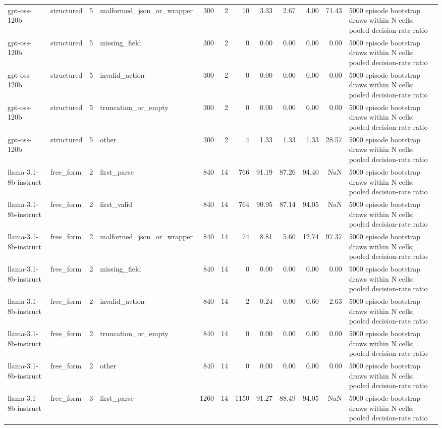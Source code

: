 \begin{tabular}{llllrrrrrrrl}
gpt-oss-120b & structured & 5 & malformed\_json\_or\_wrapper & 300 & 2 & 10 & 3.33 & 2.67 & 4.00 & 71.43 & 5000 episode bootstrap draws within N cells; pooled decision-rate ratio \\
gpt-oss-120b & structured & 5 & missing\_field & 300 & 2 & 0 & 0.00 & 0.00 & 0.00 & 0.00 & 5000 episode bootstrap draws within N cells; pooled decision-rate ratio \\
gpt-oss-120b & structured & 5 & invalid\_action & 300 & 2 & 0 & 0.00 & 0.00 & 0.00 & 0.00 & 5000 episode bootstrap draws within N cells; pooled decision-rate ratio \\
gpt-oss-120b & structured & 5 & truncation\_or\_empty & 300 & 2 & 0 & 0.00 & 0.00 & 0.00 & 0.00 & 5000 episode bootstrap draws within N cells; pooled decision-rate ratio \\
gpt-oss-120b & structured & 5 & other & 300 & 2 & 4 & 1.33 & 1.33 & 1.33 & 28.57 & 5000 episode bootstrap draws within N cells; pooled decision-rate ratio \\
llama-3.1-8b-instruct & free\_form & 2 & first\_parse & 840 & 14 & 766 & 91.19 & 87.26 & 94.40 & NaN & 5000 episode bootstrap draws within N cells; pooled decision-rate ratio \\
llama-3.1-8b-instruct & free\_form & 2 & first\_valid & 840 & 14 & 764 & 90.95 & 87.14 & 94.05 & NaN & 5000 episode bootstrap draws within N cells; pooled decision-rate ratio \\
llama-3.1-8b-instruct & free\_form & 2 & malformed\_json\_or\_wrapper & 840 & 14 & 74 & 8.81 & 5.60 & 12.74 & 97.37 & 5000 episode bootstrap draws within N cells; pooled decision-rate ratio \\
llama-3.1-8b-instruct & free\_form & 2 & missing\_field & 840 & 14 & 0 & 0.00 & 0.00 & 0.00 & 0.00 & 5000 episode bootstrap draws within N cells; pooled decision-rate ratio \\
llama-3.1-8b-instruct & free\_form & 2 & invalid\_action & 840 & 14 & 2 & 0.24 & 0.00 & 0.60 & 2.63 & 5000 episode bootstrap draws within N cells; pooled decision-rate ratio \\
llama-3.1-8b-instruct & free\_form & 2 & truncation\_or\_empty & 840 & 14 & 0 & 0.00 & 0.00 & 0.00 & 0.00 & 5000 episode bootstrap draws within N cells; pooled decision-rate ratio \\
llama-3.1-8b-instruct & free\_form & 2 & other & 840 & 14 & 0 & 0.00 & 0.00 & 0.00 & 0.00 & 5000 episode bootstrap draws within N cells; pooled decision-rate ratio \\
llama-3.1-8b-instruct & free\_form & 3 & first\_parse & 1260 & 14 & 1150 & 91.27 & 88.49 & 94.05 & NaN & 5000 episode bootstrap draws within N cells; pooled decision-rate ratio \\

\end{tabular}
